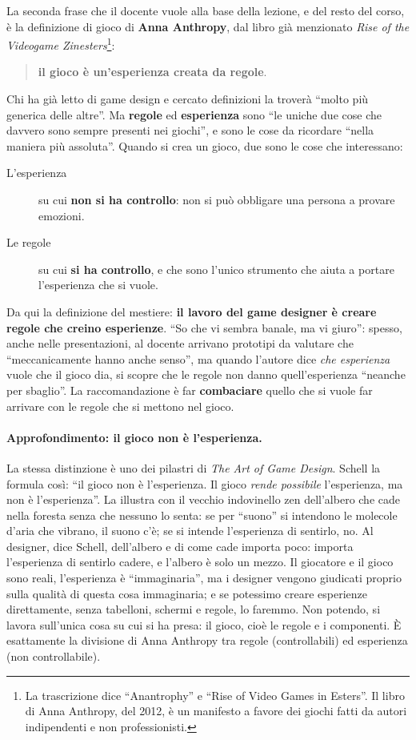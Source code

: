 La seconda frase che il docente vuole alla base della lezione, e del resto del
corso, è la definizione di gioco di \textbf{Anna Anthropy}, dal libro già
menzionato \emph{Rise of the Videogame Zinesters}\footnote{La trascrizione dice
``Anantrophy'' e ``Rise of Video Games in Esters''. Il libro di Anna Anthropy,
del 2012, è un manifesto a favore dei giochi fatti da autori indipendenti e non
professionisti.}:
\begin{quote}
\textbf{il gioco è un'esperienza creata da regole}.
\end{quote}
Chi ha già letto di game design e cercato definizioni la troverà ``molto più
generica delle altre''. Ma \textbf{regole} ed \textbf{esperienza} sono ``le
uniche due cose che davvero sono sempre presenti nei giochi'', e sono le cose da
ricordare ``nella maniera più assoluta''. Quando si crea un gioco, due sono le
cose che interessano:
\begin{description}
  \item[L'esperienza] su cui \textbf{non si ha controllo}: non si può obbligare
        una persona a provare emozioni.
  \item[Le regole] su cui \textbf{si ha controllo}, e che sono l'unico strumento
        che aiuta a portare l'esperienza che si vuole.
\end{description}
Da qui la definizione del mestiere: \textbf{il lavoro del game designer è creare
regole che creino esperienze}. ``So che vi sembra banale, ma vi giuro'': spesso,
anche nelle presentazioni, al docente arrivano prototipi da valutare che
``meccanicamente hanno anche senso'', ma quando l'autore dice \emph{che
esperienza} vuole che il gioco dia, si scopre che le regole non danno
quell'esperienza ``neanche per sbaglio''. La raccomandazione è far
\textbf{combaciare} quello che si vuole far arrivare con le regole che si
mettono nel gioco.

\paragraph{Approfondimento: il gioco non è l'esperienza.} La stessa distinzione
è uno dei pilastri di \emph{The Art of Game Design}. Schell la formula così:
``il gioco non è l'esperienza. Il gioco \emph{rende possibile} l'esperienza, ma
non è l'esperienza''. La illustra con il vecchio indovinello zen dell'albero che
cade nella foresta senza che nessuno lo senta: se per ``suono'' si intendono le
molecole d'aria che vibrano, il suono c'è; se si intende l'esperienza di
sentirlo, no. Al designer, dice Schell, dell'albero e di come cade importa poco:
importa l'esperienza di sentirlo cadere, e l'albero è solo un mezzo. Il giocatore
e il gioco sono reali, l'esperienza è ``immaginaria'', ma i designer vengono
giudicati proprio sulla qualità di questa cosa immaginaria; e se potessimo
creare esperienze direttamente, senza tabelloni, schermi e regole, lo faremmo.
Non potendo, si lavora sull'unica cosa su cui si ha presa: il gioco, cioè le
regole e i componenti. È esattamente la divisione di Anna Anthropy tra regole
(controllabili) ed esperienza (non controllabile).

